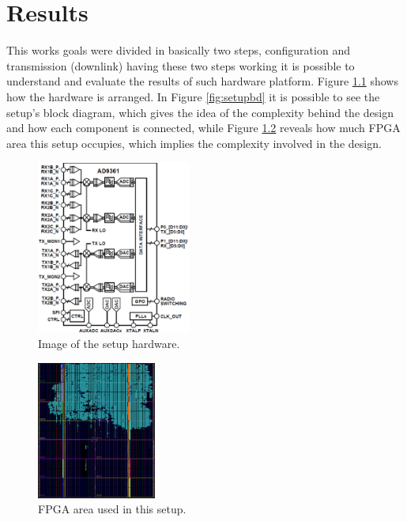 \chapter{Results}
\label{chap:results}

This works goals were divided in basically two steps, configuration and
transmission (downlink) having these two steps working it is possible to
understand and evaluate the results of such hardware platform. Figure
\ref{fig:setup} shows how the hardware is arranged. In Figure \ref{fig:setupbd}
it is possible to see the setup's block diagram, which gives the idea of the
complexity behind the design and how each component is connected, while Figure
\ref{fig:fpgaarea} reveals how much FPGA area this setup occupies, which implies
the complexity involved in the design.

\begin{figure}[htbp]
    \centering
    \includegraphics[width=0.45\textwidth]{./figures/ad9361_functional_diagram}
    \caption{ Image of the setup hardware.
    \label{fig:setup}}
\end{figure}

\begin{figure}[htbp]
    \centering
    \includegraphics[width=0.35\textwidth]{./figures/fpga_area}
    \caption{ FPGA area used in this setup.
    \label{fig:fpgaarea}}
\end{figure}

